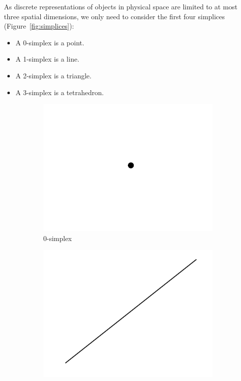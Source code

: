 As discrete representations of objects in physical space are limited to at most three spatial dimensions, we only need to consider the first four simplices (Figure~\ref{fig:simplices}):
\begin{itemize}
    \item A 0-simplex is a point.
    \item A 1-simplex is a line.
    \item A 2-simplex is a triangle.
    \item A 3-simplex is a tetrahedron.
\end{itemize}

\begin{figure}[ht]
    \centering
    \begin{subfigure}[b]{0.2\textwidth}
        \centering
        \includegraphics[width=\textwidth]{report/Images/Theory/simplices/simplices0.png}
        \caption{0-simplex}
        \label{fig:0-simplex}
    \end{subfigure}
    \hfill
    \begin{subfigure}[b]{0.2\textwidth}
        \centering
        \includegraphics[width=\textwidth]{report/Images/Theory/simplices/simplices1.png}

\end{subfigure}
\end{figure}
